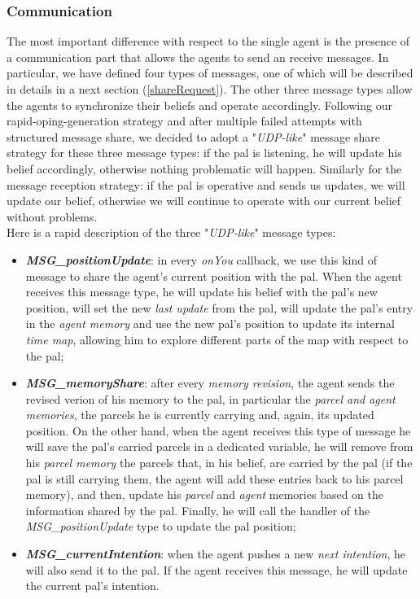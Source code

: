         \subsubsection{Communication}
            The most important difference with respect to the single agent is the presence of a communication part that allows the agents to send an receive messages. In particular, we have defined four types of messages, one of which will be described in details in a next section (\ref{shareRequest}). The other three message types allow the agents to synchronize their beliefs and operate accordingly. Following our rapid-oping-generation strategy and after multiple failed attempts with structured message share, we decided to adopt a "\textit{UDP-like}" message share strategy for these three message types: if the pal is listening, he will update his belief accordingly, otherwise nothing problematic will happen. Similarly for the message reception strategy: if the pal is operative and sends us updates, we will update our belief, otherwise we will continue to operate with our current belief without problems.
            \medskip\\
            Here is a rapid description of the three "\textit{UDP-like}" message types:
            \begin{itemize}
                \item \textbf{\textit{MSG\_positionUpdate}}: in every \textit{onYou} callback, we use this kind of message to share the agent's current position with the pal. When the agent receives this message type, he will update his belief with the pal's new position, will set the new \textit{last update} from the pal, will update the pal's entry in the \textit{agent memory} and use the new pal's position to update its internal \textit{time map}, allowing him to explore different parts of the map with respect to the pal;
                \item \textbf{\textit{MSG\_memoryShare}}: after every \textit{memory revision}, the agent sends the revised verion of his memory to the pal, in particular the \textit{parcel and agent memories}, the parcels he is currently carrying  and, again, its updated position. On the other hand, when the agent receives this type of message he will save the pal's carried parcels in a dedicated variable, he will remove from his \textit{parcel memory} the parcels that, in his belief, are carried by the pal (if the pal is still carrying them, the agent will add these entries back to his parcel memory), and then, update his \textit{parcel} and \textit{agent} memories based on the information shared by the pal. Finally, he will call the handler of the \textit{MSG\_positionUpdate} type to update the pal position;
                \item \textbf{\textit{MSG\_currentIntention}}: when the agent pushes a new \textit{next intention}, he will also send it to the pal. If the agent receives this message, he will update the current pal's intention.
            \end{itemize}
            
